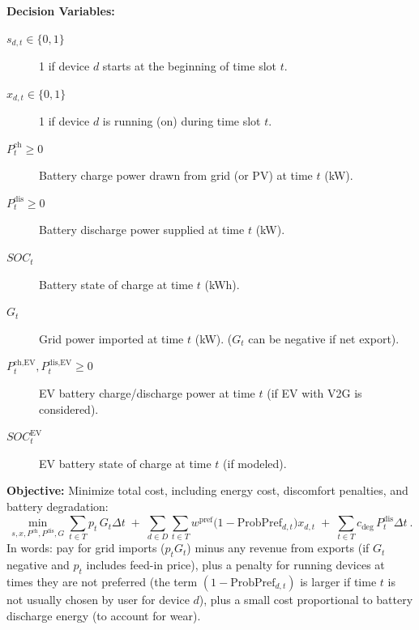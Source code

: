 \documentclass[12pt,a4paper]{article}
\begin{document}
\textbf{Decision Variables:}
\begin{description}
    \item[$s_{d,t} \in \{0,1\}$] 1 if device $d$ starts at the beginning of time slot $t$.
    \item[$x_{d,t} \in \{0,1\}$] 1 if device $d$ is running (on) during time slot $t$.
    \item[$P^{\text{ch}}_t \ge 0$] Battery charge power drawn from grid (or PV) at time $t$ (kW).
    \item[$P^{\text{dis}}_t \ge 0$] Battery discharge power supplied at time $t$ (kW).
    \item[$SOC_t$] Battery state of charge at time $t$ (kWh).
    \item[$G_t$] Grid power imported at time $t$ (kW). ($G_t$ can be negative if net export).
    \item[$P^{\text{ch,EV}}_t, P^{\text{dis,EV}}_t \ge 0$] EV battery charge/discharge power at time $t$ (if EV with V2G is considered).
    \item[$SOC^{\text{EV}}_t$] EV battery state of charge at time $t$ (if modeled).
\end{description}

\textbf{Objective:} Minimize total cost, including energy cost, discomfort penalties, and battery degradation:
\[
\min_{s, x, P^{\text{ch}}, P^{\text{dis}}, G} \sum_{t \in T} p_t \, G_t \Delta t \;+\; \sum_{d \in D}\sum_{t \in T} w^{\text{pref}} \big(1 - \text{ProbPref}_{d,t}\big) x_{d,t} \;+\; \sum_{t \in T} c_{\text{deg}}\, P^{\text{dis}}_t \Delta t~.
\]
In words: pay for grid imports ($p_t G_t$) minus any revenue from exports (if $G_t$ negative and $p_t$ includes feed-in price), plus a penalty for running devices at times they are not preferred (the term $(1-\text{ProbPref}_{d,t})$ is larger if time $t$ is not usually chosen by user for device $d$), plus a small cost proportional to battery discharge energy (to account for wear).
\end{document}

